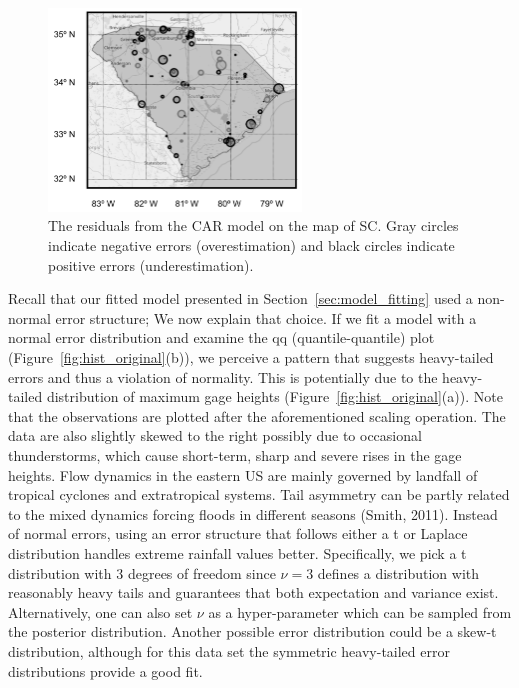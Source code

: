 \documentclass{svjour3}
\renewcommand\hl[1]{#1}
\begin{document}
\begin{figure}
 \begin{center}
\includegraphics[width=0.6\textwidth]{../images/residuals_on_map.png}
\caption{The residuals from the CAR model on the map of SC. Gray circles indicate negative errors (overestimation) and black circles indicate positive errors (underestimation).}
\label{fig:spatial_resid}
 \end{center}
\end{figure}

Recall that our fitted model presented in Section~\ref{sec:model_fitting} used a non-normal error structure;
We now explain that choice.
If we fit a model with a normal error distribution and \hl{examine the qq (quantile-quantile) plot (Figure}~\ref{fig:hist_original}(b)), we perceive  a pattern that suggests heavy-tailed errors and thus a violation of normality.
This is potentially due to the heavy-tailed distribution of maximum gage heights \hl{(Figure}~\ref{fig:hist_original}(a)).
Note that the observations are plotted after the aforementioned scaling operation.
The data are also slightly skewed to the right possibly due to occasional thunderstorms, which cause short-term, sharp and severe rises in the gage heights.
\hl{Flow dynamics in the eastern US are mainly governed by landfall of tropical cyclones and extratropical systems.
Tail asymmetry can be partly related to the mixed dynamics forcing floods in different seasons (Smith, 2011)}.
Instead of normal errors, using an error structure that follows either a t or Laplace distribution handles extreme rainfall values better.
Specifically, we pick a t distribution with 3 degrees of freedom since $ \nu =3$ defines a distribution with reasonably heavy tails and  guarantees that both expectation and variance exist.
Alternatively, one can also set $\nu$ as a hyper-parameter which can be sampled from the posterior distribution.
\hl{Another possible error distribution could be a skew-t distribution, although for this data set the symmetric heavy-tailed error distributions provide a good fit}. \\
\end{document}

